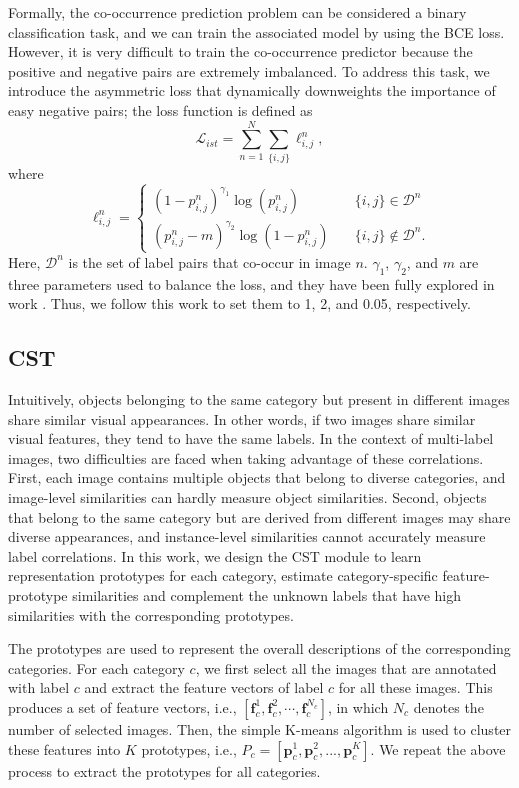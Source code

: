 Formally, the co-occurrence prediction problem can be considered a binary classification task, and we can train the associated model by using the BCE loss. However, it is very difficult to train the co-occurrence predictor because the positive and negative pairs are extremely imbalanced. To address this task, we introduce the asymmetric loss \cite{ridnik2021asymmetric} that dynamically downweights the importance of easy negative pairs; the loss function is defined as
\begin{equation}
\mathcal{L}_{ist}=\sum_{n=1}^N \sum_{\{i,j\}}\ell_{i,j}^n,
\end{equation}
where
\begin{equation}
\ell_{i,j}^n=
    \begin{cases}
         (1-p_{i,j}^n)^{\gamma_1}\log(p_{i,j}^n) \quad &\{i,j\}\in \mathcal{D}^n\\
         (p_{i,j}^n-m)^{\gamma_2}\log(1-p_{i,j}^n)  \quad &\{i,j\}\notin \mathcal{D}^n.
    \end{cases}
\end{equation}
Here, $\mathcal{D}^n$ is the set of label pairs that co-occur in image $n$. $\gamma_1$, $\gamma_2$, and $m$ are three parameters used to balance the loss, and they have been fully explored in work \cite{ridnik2021asymmetric}. Thus, we follow this work to set them to 1, 2, and 0.05, respectively.


\subsection{CST}
\label{sec:cst}
Intuitively, objects belonging to the same category but present in different images share similar visual appearances. In other words, if two images share similar visual features, they tend to have the same labels. In the context of multi-label images, two difficulties are faced when taking advantage of these correlations. First, each image contains multiple objects that belong to diverse categories, and image-level similarities can hardly measure object similarities. Second, objects that belong to the same category but are derived from different images may share diverse appearances, and instance-level similarities cannot accurately measure label correlations. In this work, we design the CST module to learn representation prototypes for each category, estimate category-specific feature-prototype similarities and complement the unknown labels that have high similarities with the corresponding prototypes.

The prototypes are used to represent the overall descriptions of the corresponding categories. For each category $c$, we first select all the images that are annotated with label $c$ and extract the feature vectors of label $c$ for all these images. This produces a set of feature vectors, i.e., $[\textbf{f}^{1}_c, \textbf{f}^{2}_c, \cdots, \textbf{f}^{N_c}_c]$, in which $N_c$ denotes the number of selected images. Then, the simple K-means algorithm is used to cluster these features into $K$ prototypes, i.e., $P_{c}=[\textbf{p}^1_c, \textbf{p}^2_c, ..., \textbf{p}^K_c]$. We repeat the above process to extract the prototypes for all categories.

